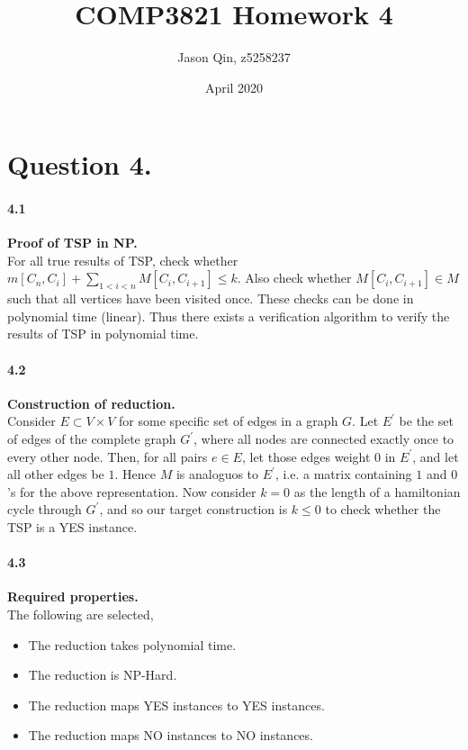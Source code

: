 \documentclass{article}
\title{COMP3821 Homework 4}
\author{Jason Qin, z5258237}
\date{April 2020}
\begin{document}
\maketitle

\section*{Question 4.}
\paragraph*{4.1} \textbf{Proof of TSP in NP.} \\

\noindent
For all true results of TSP, check whether $m[C_n, C_i] + \sum_{1<i<n} M[C_i, C_{i+1}] \leq k$.
Also check whether $M[C_i, C_{i+1}] \in M$ such that all vertices have been visited once.
These checks can be done in polynomial time (linear). Thus there exists a verification algorithm
to verify the results of TSP in polynomial time.

\paragraph*{4.2} \textbf{Construction of reduction.} \\

\noindent
Consider $E \subset V \times V$ for some specific set of edges in a graph $G$. Let $E^'$ be the set of edges
of the complete graph $G^'$, where all nodes are connected exactly once to every other node. Then, for all
pairs $e \in E$, let those edges weight $0$ in $E^'$, and let all other edges be $1$. Hence $M$ is analoguos
to $E^'$, i.e. a matrix containing $1$ and $0$'s for the above representation. Now consider $k = 0$ as the
length of a hamiltonian cycle through $G^'$, and so our target construction is $k \leq 0$ to check
whether the TSP is a YES instance.

\paragraph*{4.3} \textbf{Required properties.}  \\

\noindent
The following are selected,

\begin{itemize}
    \item The reduction takes polynomial time.
    \item The reduction is NP-Hard.
    \item The reduction maps YES instances to YES instances.
    \item The reduction maps NO instances to NO instances.
    \end{itemize}
\end{document}
